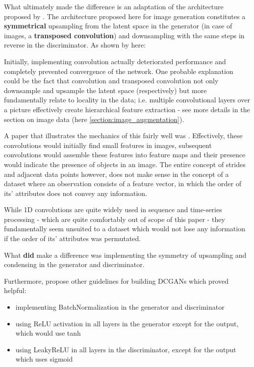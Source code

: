 \pagebreak

What ultimately made the difference is an adaptation of the architecture proposed by \cite{dcgan}. The architecture proposed here for image generation constitutes a \textbf{symmetrical} upsampling from the latent space in the generator (in case of images, a \textbf{transposed convolution}) and downsampling with the same steps in reverse in the discriminator. As shown by \cite{oversampling_gan} here:


Initially, implementing convolution actually deteriorated performance and completely prevented convergence of the network. One probable explanation could be the fact that convolution and transposed convolution not only downsample and upsample the latent space (respectively) but more fundamentally relate to locality in the data; i.e. multiple convolutional layers over a picture effectively create hierarchical feature extraction - see more details in the section on image data (here \ref{section:image_augmentation}). 

A paper that illustrates the mechanics of this fairly well was \cite{convolution_arithmetic}. Effectively, these convolutions would initially find small features in images, subsequent convolutions would assemble these features into feature maps and their presence would indicate the presence of objects in an image. The entire concept of strides and adjacent data points however, does not make sense in the concept of a dataset where an observation consists of a feature vector, in which the order of its' attributes does not convey any information. 

\pagebreak

While 1D convolutions are quite widely used in sequence and time-series processing - which are quite comfortably out of scope of this paper - they fundamentally seem unsuited to a dataset which would not lose any information if the order of its' attributes was permutated.

What \textbf{did} make a difference was implementing the symmetry of upsampling and condensing in the generator and discriminator.

Furthermore, \cite{dcgan} propose other guidelines for building \acp{DCGAN} which proved helpful:

\begin{itemize}
	\item implementing BatchNormalization in the generator and discriminator \cite{batchnorm}
	\item using ReLU activation in all layers in the generator except for the output, which would use tanh
	\item using LeakyReLU in all layers in the discriminator, except for the output which uses sigmoid
\end{itemize}

